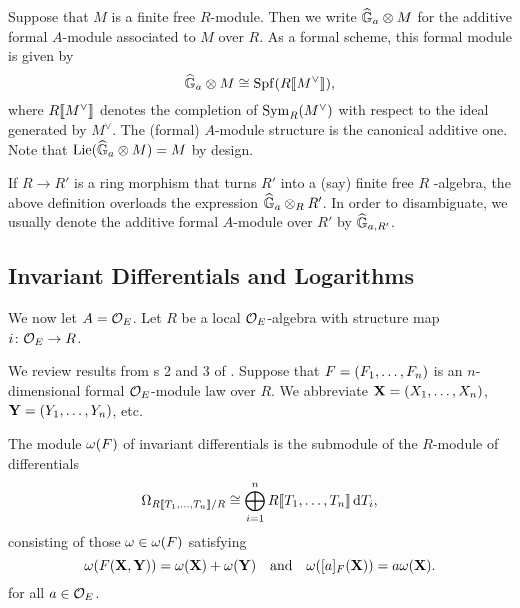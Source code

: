 \documentclass[../main.tex]{subfiles}
\begin{document}
\begin{defi}
  \label{def:additiveformalmoduleassociatedtomodule}
  Suppose that $M$ is a finite free $R$-module. Then we write
  $\widehat{\mathbb{G}}_a \otimes M$ for the additive formal $A$-module associated to $M$ over $R$.
  As a formal scheme, this formal module is given by
  \begin{equation*}
    \widehat{\mathbb{G}}_a \otimes M \cong \operatorname{Spf}(R \llbracket M^\vee \rrbracket),
  \end{equation*}
  where $R \llbracket M^\vee \rrbracket$ denotes the completion of $\operatorname{Sym}_R(M^\vee)$ with respect
  to the ideal generated by $M^\vee$. The (formal) $A$-module structure is the
  canonical additive one. 
  Note that $\operatorname{Lie}(\widehat{\mathbb{G}}_a \otimes M) = M$ by design. 
  \end{defi}
\begin{rmk} 
  If $R\to R'$ is a ring morphism that turns $R'$ into a (say) finite free
$R$ -algebra, the above definition overloads the expression $\widehat{\mathbb{G}}_a \otimes_R R'$.
  In order to disambiguate, we usually denote the additive formal $A$-module
  over $R'$ by $\widehat{\mathbb{G}}_{a, R'}$. 
\end{rmk}


\subsection{Invariant Differentials and Logarithms} %
\label{sub:Logarithms}
We now let $A = {\mathcal{O}_E}$. Let $R$ be a local ${\mathcal{O}_E}$-algebra with structure
map $i\colon  {\mathcal{O}_E} \to R$.

We review results from s
2 and 3 of \cite{hopkins1994equivariant}. 
Suppose that ${F} = (F_1, \dots, F_n)$ is an $n$-dimensional formal ${\mathcal{O}_E}$-module
law over $R$. We abbreviate $\mathbf{X} = (X_1, \dots, X_n)$, $\mathbf{Y} = (Y_1,
\dots, Y_n)$, etc.

\begin{defi}
  The module $\omega({F})$ of invariant differentials is the submodule of the
  $R$-module of differentials
  \begin{equation*}
    \Omega_{R\llbracket T_1, \dots, T_n \rrbracket/R} \cong \bigoplus_{i=1}^n R\llbracket T_1,
    \dots, T_n
    \rrbracket \, \mathrm{d} T_i,
  \end{equation*}
  consisting of those $\omega \in \omega({F})$ satisfying
  \begin{equation}\label{eq:diffcond}
    \omega({F}(\mathbf{X},\mathbf{Y})) = \omega(\mathbf{X}) + \omega(\mathbf{Y})\quad \text{and} \quad
    \omega([a]_{F}(\mathbf{X})) = a\omega(\mathbf{X}).
  \end{equation} 
  for all $a \in {\mathcal{O}_E}$. 
\end{defi}
\end{document}

